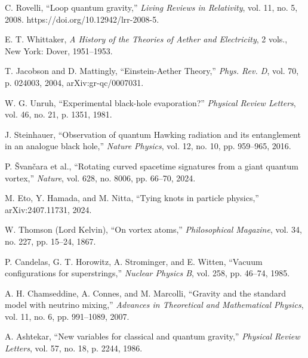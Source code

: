 \begin{thebibliography}{99}

 C. Rovelli, ``Loop quantum gravity,'' \emph{Living Reviews in Relativity}, vol. 11, no. 5, 2008. https://doi.org/10.12942/lrr-2008-5.

 E. T. Whittaker, \emph{A History of the Theories of Aether and Electricity}, 2 vols., New York: Dover, 1951--1953.

 T. Jacobson and D. Mattingly, ``Einstein-Aether Theory,'' \emph{Phys. Rev. D}, vol. 70, p. 024003, 2004, arXiv:gr-qc/0007031.

 W. G. Unruh, ``Experimental black-hole evaporation?'' \emph{Physical Review Letters}, vol. 46, no. 21, p. 1351, 1981.

 J. Steinhauer, ``Observation of quantum Hawking radiation and its entanglement in an analogue black hole,'' \emph{Nature Physics}, vol. 12, no. 10, pp. 959--965, 2016.

 P. Švančara et al., ``Rotating curved spacetime signatures from a giant quantum vortex,'' \emph{Nature}, vol. 628, no. 8006, pp. 66--70, 2024.

 M. Eto, Y. Hamada, and M. Nitta, ``Tying knots in particle physics,'' arXiv:2407.11731, 2024.

 W. Thomson (Lord Kelvin), ``On vortex atoms,'' \emph{Philosophical Magazine}, vol. 34, no. 227, pp. 15--24, 1867.

 P. Candelas, G. T. Horowitz, A. Strominger, and E. Witten, ``Vacuum configurations for superstrings,'' \emph{Nuclear Physics B}, vol. 258, pp. 46--74, 1985.

 A. H. Chamseddine, A. Connes, and M. Marcolli, ``Gravity and the standard model with neutrino mixing,'' \emph{Advances in Theoretical and Mathematical Physics}, vol. 11, no. 6, pp. 991--1089, 2007.

 A. Ashtekar, ``New variables for classical and quantum gravity,'' \emph{Physical Review Letters}, vol. 57, no. 18, p. 2244, 1986.

\end{thebibliography}
